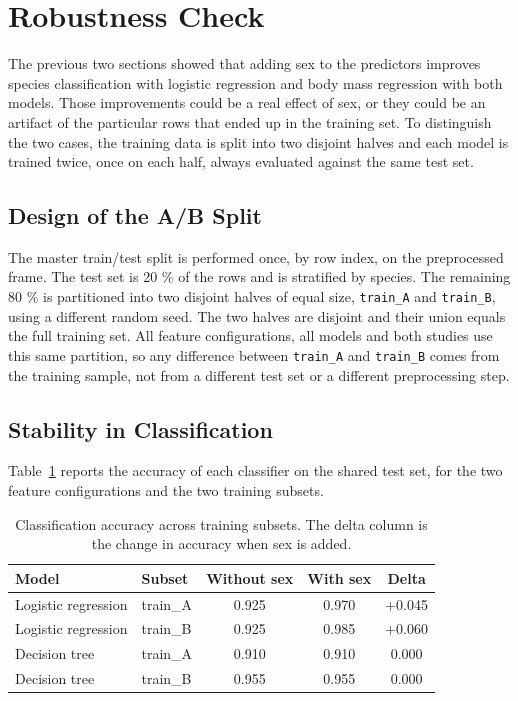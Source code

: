 \section{Robustness Check}
\label{sec:robustness}

The previous two sections showed that adding sex to the predictors improves species classification with logistic regression and body mass regression with both models. Those improvements could be a real effect of sex, or they could be an artifact of the particular rows that ended up in the training set. To distinguish the two cases, the training data is split into two disjoint halves and each model is trained twice, once on each half, always evaluated against the same test set.

\subsection{Design of the A/B Split}

The master train/test split is performed once, by row index, on the preprocessed frame. The test set is 20 \% of the rows and is stratified by species. The remaining 80 \% is partitioned into two disjoint halves of equal size, \texttt{train\_A} and \texttt{train\_B}, using a different random seed. The two halves are disjoint and their union equals the full training set. All feature configurations, all models and both studies use this same partition, so any difference between \texttt{train\_A} and \texttt{train\_B} comes from the training sample, not from a different test set or a different preprocessing step.

\subsection{Stability in Classification}

Table~\ref{tab:cls_stability} reports the accuracy of each classifier on the shared test set, for the two feature configurations and the two training subsets.

\begin{table}[htbp]
	\centering
	\caption{Classification accuracy across training subsets. The delta column is the change in accuracy when sex is added.}
	\label{tab:cls_stability}
	\begin{tabular}{llccc}
		\toprule
		Model & Subset & Without sex & With sex & Delta \\
		\midrule
		Logistic regression & train\_A & 0.925 & 0.970 & +0.045 \\
		Logistic regression & train\_B & 0.925 & 0.985 & +0.060 \\
		Decision tree       & train\_A & 0.910 & 0.910 & 0.000 \\
		Decision tree       & train\_B & 0.955 & 0.955 & 0.000 \\
		\bottomrule
	\end{tabular}
\end{table}

